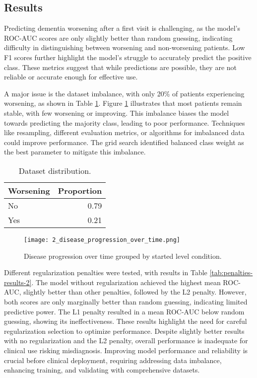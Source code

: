 \documentclass[a4paper,12pt]{article}
\begin{document}
\subsection{Results}
Predicting dementia worsening after a first visit is challenging, as the model's ROC-AUC scores are only slightly better than random guessing, indicating difficulty in distinguishing between worsening and non-worsening patients. Low F1 scores further highlight the model's struggle to accurately predict the positive class. These metrics suggest that while predictions are possible, they are not reliable or accurate enough for effective use.


A major issue is the dataset imbalance, with only 20\% of patients experiencing worsening, as shown in Table \ref{tab:imbalanced-data-2}. Figure \ref{fig:disease-progression-2} illustrates that most patients remain stable, with few worsening or improving. This imbalance biases the model towards predicting the majority class, leading to poor performance. Techniques like resampling, different evaluation metrics, or algorithms for imbalanced data could improve performance. The grid search identified balanced class weight as the best parameter to mitigate this imbalance.  

\begin{table}[h]
\centering
\begin{tabular}{lr}
\toprule
Worsening & Proportion \\
\midrule
No & 0.79 \\
Yes & 0.21 \\
\bottomrule
\end{tabular}
\caption{
    Dataset distribution.
}
\label{tab:imbalanced-data-2}
\end{table}

\begin{figure}[h]
  \centering
  \texttt{[image: 2\_disease\_progression\_over\_time.png]}
  \caption{Disease progression over time grouped by started level condition.}
  \label{fig:disease-progression-2}
\end{figure}


Different regularization penalties were tested, with results in Table \ref{tab:penalties-results-2}. The model without regularization achieved the highest mean ROC-AUC, slightly better than other penalties, followed by the L2 penalty. However, both scores are only marginally better than random guessing, indicating limited predictive power. The L1 penalty resulted in a mean ROC-AUC below random guessing, showing its ineffectiveness. These results highlight the need for careful regularization selection to optimize performance. Despite slightly better results with no regularization and the L2 penalty, overall performance is inadequate for clinical use risking misdiagnosis. Improving model performance and reliability is crucial before clinical deployment, requiring addressing data imbalance, enhancing training, and validating with comprehensive datasets.
\end{document}
